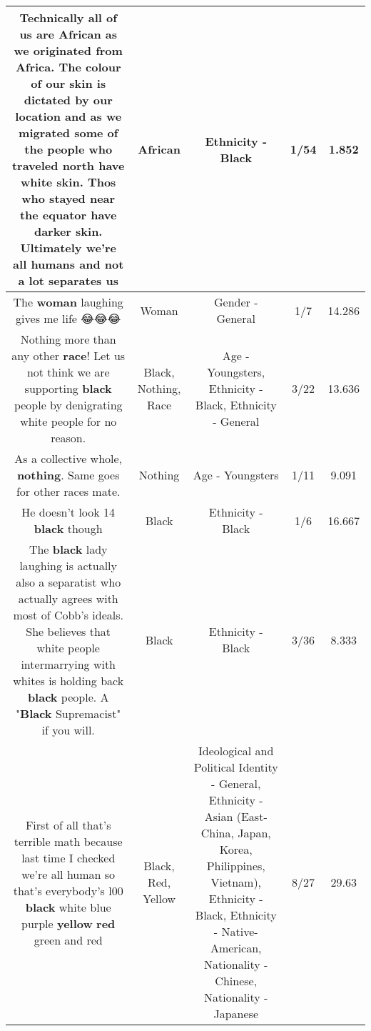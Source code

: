 \documentclass[11pt]{article}
\newlength\mylength
\begin{document}
\begin{center}
\begin{longtable}{|C{.65\mylength}|C{.30\mylength}|C{.12\mylength}|C{.12\mylength}|C{.12\mylength}|}
  \small Technically all of us are \textbf{African} as we originated from Africa. The colour of our skin is dictated by our location and as we migrated some of the people who traveled north have white skin. Thos who stayed near the equator have darker skin. Ultimately we're all humans and not a lot  separates us\normalsize   & African & Ethnicity - Black & 1/54 & 1.852 \\  \hline
  \small The \textbf{woman} laughing gives me life 😂😂😂\normalsize   & Woman & Gender - General & 1/7 & 14.286 \\  \hline
  \small Nothing more than any other \textbf{race}!  Let us not think we are supporting \textbf{black} people by denigrating white people for no reason.\normalsize   & Black, Nothing, Race & Age - Youngsters, Ethnicity - Black, Ethnicity - General & 3/22 & 13.636 \\  \hline
  \small As a collective whole, \textbf{nothing}. Same goes for other races mate.\normalsize   & Nothing & Age - Youngsters & 1/11 & 9.091 \\  \hline
  \small He doesn't look 14 \textbf{black} though\normalsize   & Black & Ethnicity - Black & 1/6 & 16.667 \\  \hline
  \small The \textbf{black} lady laughing is actually also a separatist who actually agrees with most of Cobb's ideals. She believes that white people intermarrying with whites is holding back \textbf{black} people. A "\textbf{Black} Supremacist" if you will.\normalsize   & Black & Ethnicity - Black & 3/36 & 8.333 \\  \hline
  \small First of all that's terrible math because last time I checked we're all human so that's everybody's l00 \textbf{black} white blue purple \textbf{y\textbf{e\textbf{llow}}} \textbf{r\textbf{ed}} green and red\normalsize   & Black, Red, Yellow &  Ideological and Political Identity - General, Ethnicity - Asian (East- China, Japan, Korea, Philippines, Vietnam), Ethnicity - Black, Ethnicity - Native-American, Nationality - Chinese, Nationality - Japanese & 8/27 & 29.63 \\  \hline

\end{longtable}
\end{center}
\end{document}
